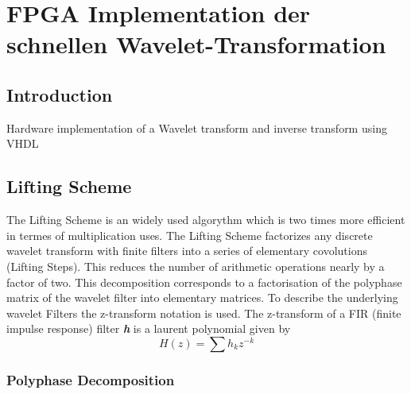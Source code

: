 %
%
%
\chapter{FPGA Implementation der schnellen Wavelet-Transformation\label{chapter:fpga}}
\begin{refsection}

\section{Introduction}

Hardware implementation of a Wavelet transform and inverse transform using VHDL


\section{Lifting Scheme}

The Lifting Scheme is an widely used algorythm which is two times more efficient in termes of multiplication uses. The Lifting Scheme factorizes any discrete wavelet transform  with finite filters into a series of elementary covolutions (Lifting Steps). This reduces the number of arithmetic operations nearly by a factor of two.
This decomposition corresponds to a factorisation of the polyphase matrix of the wavelet filter into elementary matrices. 
To describe the underlying wavelet Filters the z-transform notation is used. The z-transform of a FIR (finite impulse response) filter \textit{\textbf{h}}  is a laurent polynomial given by
\begin{equation}\label{equ:impulse}
	H(z) = \sum h_k z^{-k}
\end{equation}


\subsection{Polyphase Decomposition}


\end{refsection}

